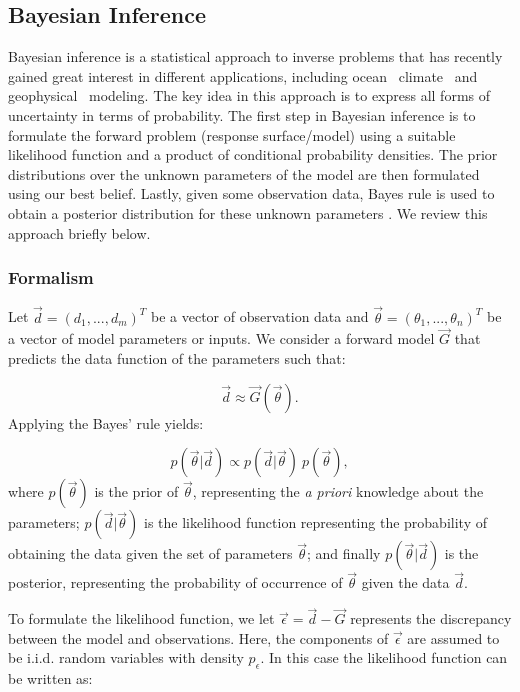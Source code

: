 \subsection{Bayesian Inference}
 \label{sec:inference}
 
Bayesian inference is a statistical approach to inverse problems
that has recently gained great interest in different applications, including
ocean~\citep{Alexanderian2011a,Zedler2012,sraj:2013a}
climate~\citep{OlsonEtAl2012} and geophysical~\citep{Malinverno2002} modeling.
The key idea in this approach is to express all forms of uncertainty
in terms of probability. The first step in Bayesian inference 
is to formulate the forward problem (response surface/model) using 
a suitable likelihood function and a product of conditional probability densities. 
The prior distributions over the unknown parameters of the model
are then formulated using our best belief. Lastly, given some observation data, Bayes rule 
is used to obtain a posterior distribution for these unknown parameters
\citep{sivia}. We review this approach briefly below.
\subsubsection{Formalism}

Let $\vec{d}=(d_1,...,d_m)^T$ be a vector of observation data and $\vec{\theta}=(\theta_1,...,\theta_n)^T$ be a vector of model parameters or inputs. We consider a forward model $\vec G$ that predicts the data function of 
the parameters such that:

\begin{equation}
\vec d \approx \vec{G}( \vec \theta).
\end{equation}
Applying the Bayes' rule yields:

\begin{equation}
 p(\vec{\theta}| \vec d) \propto 
 p(\vec d | \vec{\theta}) \ p(\vec{\theta}), 
\label{eq:bayes}
\end{equation}
where $p(\vec{\theta})$ is the prior of $\vec{\theta}$, representing the \emph{a priori} knowledge
about the parameters; 
$p(\vec d| \vec{\theta})$ is the likelihood function representing
the probability of obtaining the data given the set of parameters $\vec{\theta}$;
and finally $p(\vec{\theta}| \vec d)$ is the posterior,
representing the probability of occurrence of $\vec{\theta}$ given the data $\vec d $.

To formulate the likelihood function, we let $\vec \epsilon = \vec d - \vec{G}$
represents the discrepancy between the model and observations.
Here, the components of $\vec \epsilon $ are assumed to be i.i.d. random variables with density $p_{\epsilon}$.
In this case the likelihood function can be written as:

